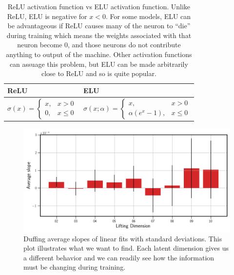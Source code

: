 \begin{table}[hb!]
    \centering
    \begin{minipage}{\textwidth}
        \begin{tabularx}{\textwidth}{|>{\centering\arraybackslash}X|>{\centering\arraybackslash}X|} \hline%
            ReLU & ELU \\ \hline \hline
            $\sigma(x) = \begin{cases}
                x, & x > 0 \\
                0, & x \leq 0
            \end{cases}$ & 
            $\sigma(x; \alpha) = \begin{cases}
                x, & x > 0 \\
                \alpha(e^x - 1), & x \leq 0
            \end{cases}$ \\ \hline
        \end{tabularx}
    \end{minipage}
    \caption{ReLU activation function vs ELU activation function. Unlike ReLU, ELU is negative 
    for $x < 0$. For some models, ELU can be advantageous if ReLU causes many of the neuron to
    ``die'' during training which means the weights associated with that neuron become 0, and
    those neurons do not contribute anything to output of the machine. Other activation functions
    can assuage this problem, but ELU can be made arbitrarily close to ReLU and so is quite
    popular.}
    \label{table:elu vs relu}
\end{table}

\begin{figure}[!ht]
    \centering
    \begin{minipage}{\textwidth}
        \includegraphics[width=\textwidth]{"../Figures/duffing_slope_linear_fit.png"} 
    \end{minipage}%
    \caption{Duffing average slopes of linear fits with standard deviations. This plot illustrates what we want 
    to find. Each latent dimension gives us a different behavior and we can readily see how the information must
    be changing during training.}
    \label{fig:duffing average slopes}
\end{figure}

